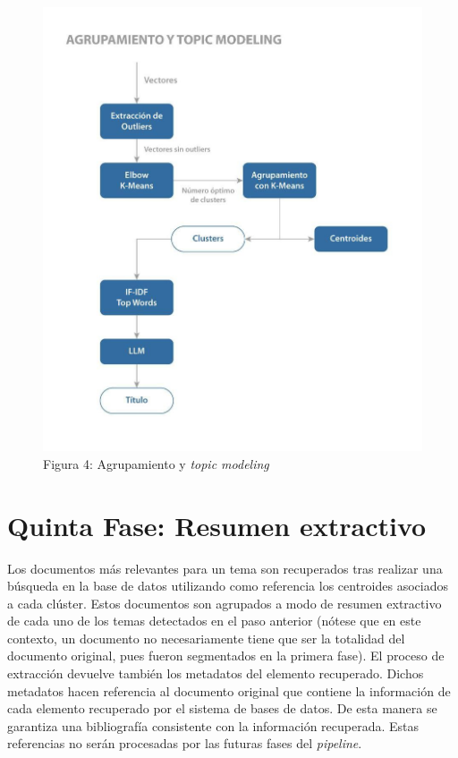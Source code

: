     \begin{figure}[H]    
        \centering
        \includegraphics[scale = 0.25]{Figures/pipeline_3.jpg}
        \caption*{Figura 4: Agrupamiento y \emph{topic modeling}}
    \end{figure}

    \section{Quinta Fase: Resumen extractivo} 
    Los documentos más relevantes para un tema son recuperados tras realizar una búsqueda en la base de datos utilizando como referencia los centroides asociados a cada clúster. Estos documentos son agrupados a modo de resumen extractivo de cada uno de los temas detectados en el paso anterior (nótese que en este contexto, un documento no necesariamente tiene que ser la totalidad del documento original, pues fueron segmentados en la primera fase). El proceso de extracción devuelve también los metadatos del elemento recuperado. Dichos metadatos hacen referencia al documento original que contiene la información de cada elemento recuperado por el sistema de bases de datos. De esta manera se garantiza una bibliografía consistente con la información recuperada. Estas referencias no serán procesadas por las futuras fases del \emph{pipeline}.
    
